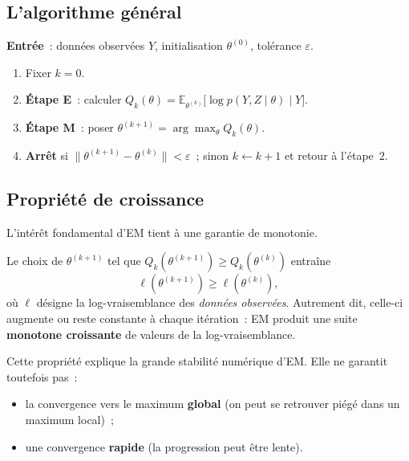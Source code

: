 \subsection{L'algorithme général}

\medskip

\begin{mdframed}
\begin{definition}
\textbf{Entrée}~: données observées $Y$, initialisation $\theta^{(0)}$,
tolérance $\varepsilon$.
\begin{enumerate}
  \item Fixer $k = 0$.
  \item \textbf{Étape E}~: calculer
        $Q_k(\theta) = \mathbb{E}_{\theta^{(k)}}\!\big[\log p(Y, Z \mid \theta)
        \mid Y\big]$.
  \item \textbf{Étape M}~: poser
        $\theta^{(k+1)} = \arg\max_{\theta} Q_k(\theta)$.
  \item \textbf{Arrêt} si $\|\theta^{(k+1)} - \theta^{(k)}\| < \varepsilon$~;
        sinon $k \leftarrow k + 1$ et retour à l'étape~2.
\end{enumerate}
\end{definition}
\end{mdframed}

\subsection{Propriété de croissance}

L'intérêt fondamental d'EM tient à une garantie de monotonie.

\begin{remarque}
Le choix de $\theta^{(k+1)}$ tel que $Q_k(\theta^{(k+1)}) \geq Q_k(\theta^{(k)})$
entraîne
$$
\ell(\theta^{(k+1)}) \geq \ell(\theta^{(k)}),
$$
où $\ell$ désigne la log-vraisemblance des \textit{données observées}. Autrement
dit, celle-ci augmente ou reste constante à chaque itération~: EM produit une
suite \textbf{monotone croissante} de valeurs de la log-vraisemblance.
\end{remarque}

Cette propriété explique la grande stabilité numérique d'EM. Elle ne garantit
toutefois pas~:
\begin{itemize}
  \item la convergence vers le maximum \textbf{global} (on peut se retrouver
        piégé dans un maximum local)~;
  \item une convergence \textbf{rapide} (la progression peut être lente).
\end{itemize}

